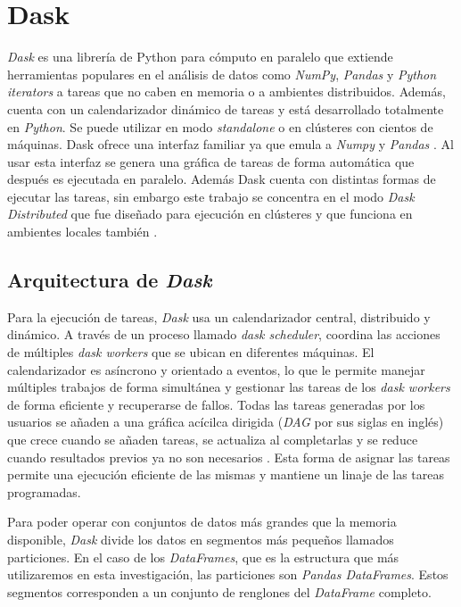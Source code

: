 \section{Dask}

\textit{Dask} es una librería de Python para cómputo en paralelo que extiende herramientas populares en el análisis de datos como \textit{NumPy}, \textit{Pandas} y \textit{Python iterators} a tareas que no caben en memoria o a ambientes distribuidos. Además, cuenta con un calendarizador dinámico de tareas y está desarrollado totalmente en \textit{Python}. Se puede utilizar en modo \textit{standalone} o en clústeres con cientos de máquinas. Dask ofrece una interfaz familiar ya que emula a \textit{Numpy} y \textit{Pandas} \cite{daskdocs}. Al usar esta interfaz se genera una gráfica de tareas de forma automática que después es ejecutada en paralelo. Además Dask cuenta con distintas formas de ejecutar las tareas, sin embargo este trabajo se concentra en el modo \textit{Dask Distributed} que fue diseñado para ejecución en clústeres y que funciona en ambientes locales también \cite{daskscheduling}.

\subsection{Arquitectura de \textit{Dask}}

Para la ejecución de tareas, \textit{Dask} usa un calendarizador central, distribuido y dinámico. A través de un proceso llamado \textit{dask scheduler}, coordina las acciones de múltiples \textit{dask workers} que se ubican en diferentes máquinas. El calendarizador es asíncrono y orientado a eventos, lo que le permite manejar múltiples trabajos de forma simultánea y gestionar las tareas de los \textit{dask workers} de forma eficiente y recuperarse de fallos. Todas las tareas generadas por los usuarios se añaden a una gráfica acícilca dirigida (\textit{DAG} por sus siglas en inglés) que crece cuando se añaden tareas, se actualiza al completarlas y se reduce cuando resultados previos ya no son necesarios \cite{daskdistributed}. Esta forma de asignar las tareas permite una ejecución eficiente de las mismas y mantiene un linaje de las tareas programadas.

Para poder operar con conjuntos de datos más grandes que la memoria disponible, \textit{Dask} divide los datos en segmentos más pequeños llamados particiones. En el caso de los \textit{DataFrames}, que es la estructura que más utilizaremos en esta investigación, las particiones son \textit{Pandas DataFrames}. Estos segmentos corresponden a un conjunto de renglones del \textit{DataFrame} completo.


